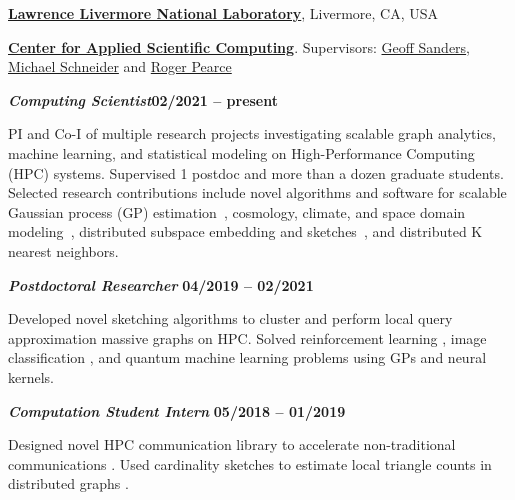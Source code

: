 \href{https://www.llnl.gov/}{\textbf{Lawrence Livermore National Laboratory}},
Livermore, CA, USA

\href{https://computation.llnl.gov/casc/}{\textbf{Center for Applied Scientific Computing}}.
Supervisors:
\href{https://people.llnl.gov/sanders29}{Geoff Sanders},
\href{https://pls.llnl.gov/people/staff-bios/physics/schneider-m}
{Michael Schneider}
and
\href{https://people.llnl.gov/pearce7}{Roger Pearce}

\vspace{-0.5em}

\begin{outerlist}

  \vspace{-0.5em}

  \item[] \textbf{\textit{Computing Scientist}}\hfill \textbf{02/2021 -- present}

  \vspace{-0.5em}

  PI and Co-I of multiple research projects investigating scalable graph
  analytics, machine learning, and statistical modeling on High-Performance
  Computing (HPC) systems.
  Supervised 1 postdoc and more than a dozen graduate students.
  Selected research contributions include novel algorithms and software for
  scalable Gaussian process (GP) estimation~\cite{muyskens2021muygps}, cosmology,
  climate, and space domain modeling~\cite{muyskens2022star}, distributed
  subspace embedding and sketches~\cite{priest2020scaling}, and distributed K
  nearest neighbors.

  \vspace{-0.5em}

  \item[] \textbf{\textit{Postdoctoral Researcher}}%
  \hfill \textbf{04/2019 -- 02/2021}

  \vspace{-0.5em}

  Developed novel sketching algorithms to cluster \cite{priest2020scaling} and
  perform local query approximation \cite{priest2020degreesketch} massive graphs
  on HPC.
  Solved reinforcement learning \cite{goumiri2020reinforcement}, image
  classification \cite{goumiri2020star}, and quantum machine learning
  \cite{otten2020quantum} problems using GPs and neural kernels.

  \vspace{-0.5em}

  \item[] \textbf{\textit{Computation Student Intern}}%
  \hfill \textbf{05/2018 -- 01/2019}

  \vspace{-0.5em}

  Designed novel HPC communication library to accelerate non-traditional
  communications \cite{priest2019you}.
  Used cardinality sketches to estimate local triangle counts in distributed
  graphs \cite{priest2018estimating}.

\end{outerlist}
